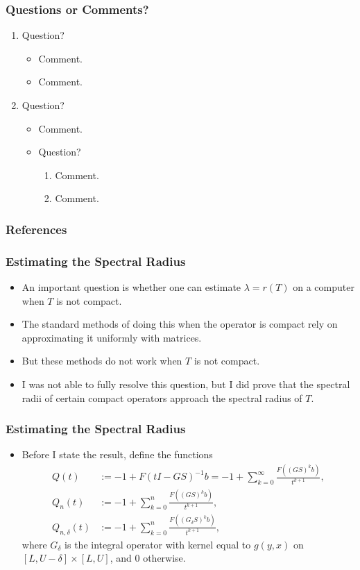 \documentclass{beamer}
\newcommand{\dd}{{\delta}}
\begin{document}
\begin{frame}
	\frametitle{Questions or Comments?}
	\begin{enumerate}
		\pause
		\item Question?
		\begin{itemize}
			\pause
			\item Comment.
			\pause
			\item Comment.
		\end{itemize}
		\pause
		\item Question?
			\begin{itemize}
			\pause
			\item Comment.
			\pause
			\item Question?
				\begin{enumerate}
					\pause
					\item Comment.
					\pause
					\item Comment.
				\end{enumerate}
			\end{itemize}
	\end{enumerate}
\end{frame}

\begin{frame}[allowframebreaks]
	\frametitle{References}
		\printbibliography
\end{frame}

\begin{frame}
	\frametitle{Estimating the Spectral Radius}
	\begin{itemize}
		\item An important question is whether one can estimate $\lambda = r(T)$ on a computer when $T$ is not compact.
		\pause
		\item The standard methods of doing this when the operator is compact rely on approximating it uniformly with matrices.
		\pause
		\item But these methods do not work when $T$ is not compact.
		\pause
		\item I was not able to fully resolve this question, but I did prove that the spectral radii of certain compact operators approach the spectral radius of $T$.
	\end{itemize}
\end{frame}

\begin{frame}
	\frametitle{Estimating the Spectral Radius}
	\begin{itemize}
		\item Before I state the result, define the functions
		\pause
		\begin{align*}
			Q(t) &:= -1 + F(t I - GS)^{-1} b = -1 + \sum_{k = 0}^\infty \frac{F((GS)^kb)}{t^{k+1}}, \\
			Q_n(t) &:= -1 + \sum_{k = 0}^n \frac{F((GS)^kb)}{t^{k+1}}, \\
			Q_{n, \dd}(t) &:= -1 + \sum_{k = 0}^n \frac{F((G_\dd S)^kb)}{t^{k+1}},
		\end{align*}
		\pause
		where $G_\dd$ is the integral operator with kernel equal to $g(y, x)$ on $[L, U-\dd] \times [L, U]$, and $0$ otherwise.
	\end{itemize}
\end{frame}
\end{document}
